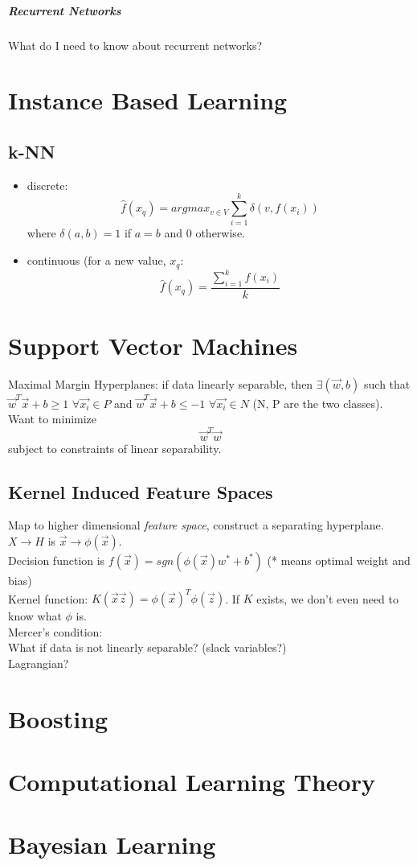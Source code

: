 \documentclass[11pt]{article}
\begin{document}
\subparagraph{Recurrent Networks}
What do I need to know about recurrent networks?

\section{Instance Based Learning}
\subsection{k-NN}
\begin{itemize}
\item discrete: $$\hat{f} (x_q) =argmax_{v \in V} \sum_{i=1}^k{\delta(v, f(x_i))}$$ where $\delta(a,b) =1$ if $a=b$ and $0$ otherwise.
\item continuous (for a new value, $x_q$: $$\hat{f} (x_q) = \frac{\sum_{i=1}^{k}{f(x_i)}}{k}$$
\end{itemize}

\section{Support Vector Machines}
Maximal Margin Hyperplanes: if data linearly separable, then $\exists (\vec{w}, b)$ such that $\vec{w}^T\vec{x} + b \geq 1$ $\forall \vec{x_i} \in P$ and $\vec{w}^T\vec{x} + b \leq -1$ $\forall \vec{x_i} \in N$ (N, P are the two classes). Want to minimize $$\vec{w}^T\vec{w}$$ subject to constraints of linear separability.
\subsection{Kernel Induced Feature Spaces}
Map to higher dimensional \textit{feature space}, construct a separating hyperplane. $X \rightarrow H$ is $\vec{x} \rightarrow \phi(\vec{x}).$\\
Decision function is $f(\vec{x}) = sgn (\phi(\vec{x}) w^*+b^*)$ (* means optimal weight and bias)\\
Kernel function: $K(\vec{x} \vec{z}) =\phi(\vec{x})^T\phi(\vec{z})$. If $K$ exists, we don't even need to know what $\phi$ is.\\
Mercer's condition: \\
What if data is not linearly separable? (slack variables?)\\
Lagrangian?\\

\section{Boosting}

\section{Computational Learning Theory}

\section{Bayesian Learning}
\end{document}
